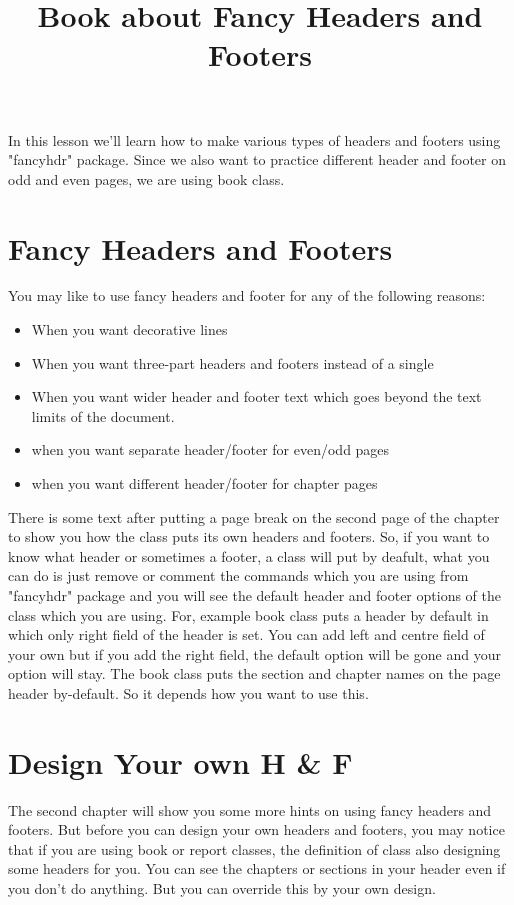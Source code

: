 \documentclass{book}
\title{Book about Fancy Headers and Footers}
\date{}
\author{}
\begin{document}
\maketitle
In this lesson we'll learn how to make various types of headers and footers using "fancyhdr" package. Since we also want to practice different header and footer on odd and even pages, we are using book class.  
 
 \chapter{Fancy Headers and Footers}

You may like to use fancy headers and footer for any of the following reasons:

\begin{itemize}
\item When you want decorative lines
\item When you want three-part headers and footers instead of a single
\item When you want wider header and footer text which goes beyond the text limits of the document.
\item when you want separate header/footer for even/odd pages
\item when you want different header/footer for chapter pages
\end{itemize}
\pagebreak
There is some text after putting a page break on the second page of the chapter to show you how the class puts its own headers and footers. So, if you want to know what header or sometimes a footer, a class will put by deafult, what you can do is just remove or comment the commands which you are using from "fancyhdr" package and you will see the default header and footer options of the class which you are using. For, example book class puts a header by default in which only right field of the header is set. You can add left and centre field of your own but if you add the right field, the default option will be gone and your option will stay. The book class puts the section and chapter names on the page header by-default. So it depends how you want to use this.
\chapter{Design Your own H \& F}
The second chapter will show you some more hints on using fancy headers and footers. But before you can design your own headers and footers, you may notice that if you are using book or report classes, the definition of class also designing some headers for you. You can see the chapters or sections in your header even if you don't do anything. But you can override this by your own design.
\end{document}
